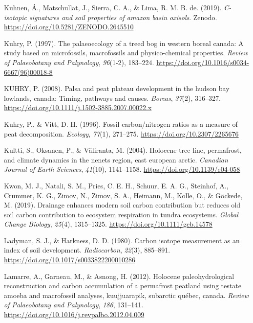 \documentclass[]{article}
\begin{document}
\leavevmode\hypertarget{ref-https:ux2fux2fdoi.orgux2f10.5281ux2fzenodo.2645510}{}%
Kuhnen, Á., Matschullat, J., Sierra, C. A., \& Lima, R. M. B. de.
(2019). \emph{C-isotopic signatures and soil properties of amazon basin
oxisols}. Zenodo. \url{https://doi.org/10.5281/ZENODO.2645510}

\leavevmode\hypertarget{ref-Kuhry_1997}{}%
Kuhry, P. (1997). The palaeoecology of a treed bog in western boreal
canada: A study based on microfossils, macrofossils and physico-chemical
properties. \emph{Review of Palaeobotany and Palynology},
\emph{96}(1-2), 183--224.
\url{https://doi.org/10.1016/s0034-6667(96)00018-8}

\leavevmode\hypertarget{ref-KUHRY_2008}{}%
KUHRY, P. (2008). Palsa and peat plateau development in the hudson bay
lowlands, canada: Timing, pathways and causes. \emph{Boreas},
\emph{37}(2), 316--327.
\url{https://doi.org/10.1111/j.1502-3885.2007.00022.x}

\leavevmode\hypertarget{ref-Kuhry_1996}{}%
Kuhry, P., \& Vitt, D. H. (1996). Fossil carbon/nitrogen ratios as a
measure of peat decomposition. \emph{Ecology}, \emph{77}(1), 271--275.
\url{https://doi.org/10.2307/2265676}

\leavevmode\hypertarget{ref-Kultti_2004}{}%
Kultti, S., Oksanen, P., \& Väliranta, M. (2004). Holocene tree line,
permafrost, and climate dynamics in the nenets region, east european
arctic. \emph{Canadian Journal of Earth Sciences}, \emph{41}(10),
1141--1158. \url{https://doi.org/10.1139/e04-058}

\leavevmode\hypertarget{ref-Kwon_2019}{}%
Kwon, M. J., Natali, S. M., Pries, C. E. H., Schuur, E. A. G., Steinhof,
A., Crummer, K. G., Zimov, N., Zimov, S. A., Heimann, M., Kolle, O., \&
Göckede, M. (2019). Drainage enhances modern soil carbon contribution
but reduces old soil carbon contribution to ecosystem respiration in
tundra ecosystems. \emph{Global Change Biology}, \emph{25}(4),
1315--1325. \url{https://doi.org/10.1111/gcb.14578}

\leavevmode\hypertarget{ref-Ladyman_1980}{}%
Ladyman, S. J., \& Harkness, D. D. (1980). Carbon isotope measurement as
an index of soil development. \emph{Radiocarbon}, \emph{22}(3),
885--891. \url{https://doi.org/10.1017/s0033822200010286}

\leavevmode\hypertarget{ref-Lamarre_2012}{}%
Lamarre, A., Garneau, M., \& Asnong, H. (2012). Holocene
paleohydrological reconstruction and carbon accumulation of a permafrost
peatland using testate amoeba and macrofossil analyses, kuujjuarapik,
subarctic québec, canada. \emph{Review of Palaeobotany and Palynology},
\emph{186}, 131--141.
\url{https://doi.org/10.1016/j.revpalbo.2012.04.009}
\end{document}
